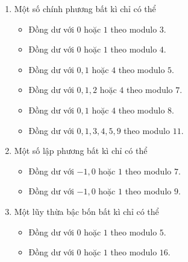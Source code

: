 \begin{enumerate}
    \item Một số chính phương bất kì chỉ có thể
    \begin{multicols}{2}
            \begin{itemize}
            \item Đồng dư với $0$ hoặc $1$ theo modulo $3.$
            \item Đồng dư với $0$ hoặc $1$ theo modulo $4.$
            \item Đồng dư với $0,1$ hoặc $4$ theo modulo $5.$
            \item Đồng dư với $0,1,2$ hoặc $4$ theo modulo $7.$
            \item Đồng dư với $0,1$ hoặc $4$ theo modulo $8.$
            \item Đồng dư với $0,1,3,4,5,9$ theo modulo $11.$            
        \end{itemize}
    \end{multicols}
    \item Một số lập phương bất kì chỉ có thể
        \begin{itemize}
            \item Đồng dư với $-1,0$ hoặc $1$ theo modulo $7.$
            \item Đồng dư với $-1,0$ hoặc $1$ theo modulo $9.$
        \end{itemize} 
    \item Một lũy thừa bậc bốn bất kì chỉ có thể 
        \begin{itemize}
            \item Đồng dư với $0$ hoặc $1$ theo modulo $5.$
            \item Đồng dư với $0$ hoặc $1$ theo modulo $16.$
        \end{itemize}
\end{enumerate}

